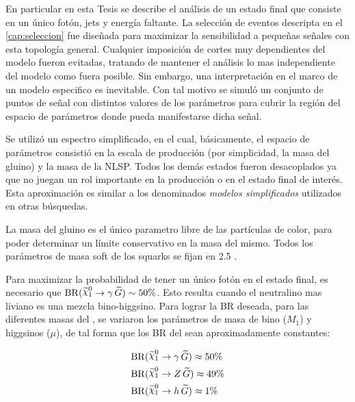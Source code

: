 En particular en esta Tesis se describe el análisis de un estado final que
consiste en un único fotón, jets y energía faltante.
La selección de eventos descripta en el \cref{cap:seleccion} fue diseñada para
maximizar la sensibilidad a pequeñas señales con esta topología general.
Cualquier imposición de cortes muy dependientes del modelo fueron evitadas,
tratando de mantener el análisis lo mas independiente del modelo como fuera
posible. Sin embargo, una interpretación en el marco de un modelo especifico es
inevitable. Con tal motivo se simuló un conjunto de puntos de señal con
distintos valores de los parámetros para cubrir la región del espacio de
parámetros donde pueda manifestarse dicha señal.


Se utilizó un espectro simplificado, en el cual, básicamente, el espacio de
parámetros consistió en la escala de producción (por simplicidad, la masa del
gluino) y la masa de la NLSP. Todos los demás estados fueron desacoplados ya que
no juegan un rol importante en la producción o en el estado final de interés.
Esta aproximación es similar a los denominados \emph{modelos simplificados}
utilizados en otras búsquedas.

La masa del gluino es el único parametro libre de las partículas de color, para
poder determinar un límite conservativo en la masa del mismo. Todos los
parámetros de masa soft de los squarks se fijan en 2.5 \tev.

Para maximizar la probabilidad de tener un único fotón en el estado final, es
necesario que $\mathrm{BR}(\ninoone \to \gam\,\gravino) \sim 50\%$. Esto resulta
cuando el neutralino mas liviano es una mezcla bino-higgsino. Para lograr la BR
deseada, para las diferentes masas del {\ninoone}, se variaron los parámetros de
masa de bino ($M_1$) y higgsinos ($\mu$), de tal forma que los BR del {\ninoone}
sean aproximadamente constantes:

\begin{align}
  &\mathrm{BR}(\ninoone \to \gam\, \gravino) \approx 50\% \label{eq:n1_gam}\\
  &\mathrm{BR}(\ninoone \to Z\, \gravino) \approx 49\%    \label{eq:n1_z} \\
  &\mathrm{BR}(\ninoone \to h\, \gravino) \approx 1\%     \label{eq:n1_h}
\end{align}

